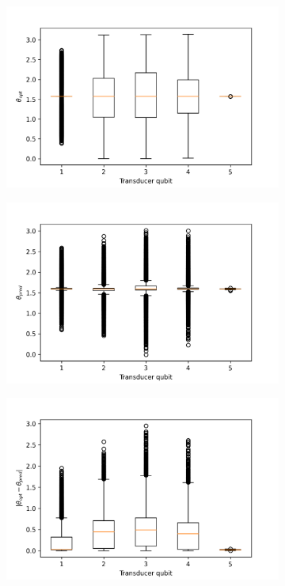 \begin{figure}
	\centering
	\begin{subfigure}{0.32\textwidth}
		\centering
		\includegraphics[width=\textwidth]{img/theta_opt_box}
	\end{subfigure}
	\begin{subfigure}{0.32\textwidth}
		\centering
		\includegraphics[width=\textwidth]{img/theta_pred_box}
	\end{subfigure}
	\begin{subfigure}{0.32\textwidth}
		\centering
		\includegraphics[width=\textwidth]{img/delta_theta_box}

\end{subfigure}
\end{figure}

